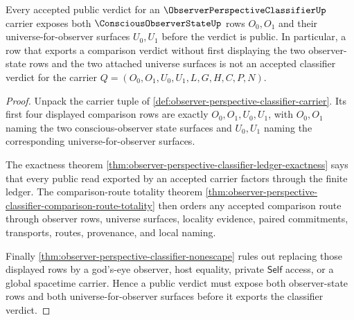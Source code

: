 \begin{theorem}
\label{thm:observer-perspective-classifier-state-totality}
Every accepted public verdict for an $\ObserverPerspectiveClassifierUp$ carrier exposes both $\ConsciousObserverStateUp$ rows $O_0,O_1$ and their universe-for-observer surfaces $U_0,U_1$ before the verdict is public. In particular, a row that exports a comparison verdict without first displaying the two observer-state rows and the two attached universe surfaces is not an accepted classifier verdict for the carrier $Q=(O_0,O_1,U_0,U_1,L,G,H,C,P,N)$.
\end{theorem}
\begin{proof}
Unpack the carrier tuple of \autoref{def:observer-perspective-classifier-carrier}. Its first four displayed comparison rows are exactly $O_0,O_1,U_0,U_1$, with $O_0,O_1$ naming the two conscious-observer state surfaces and $U_0,U_1$ naming the corresponding universe-for-observer surfaces.

The exactness theorem \autoref{thm:observer-perspective-classifier-ledger-exactness} says that every public read exported by an accepted carrier factors through the finite ledger. The comparison-route totality theorem \autoref{thm:observer-perspective-classifier-comparison-route-totality} then orders any accepted comparison route through observer rows, universe surfaces, locality evidence, paired commitments, transports, routes, provenance, and local naming.

Finally \autoref{thm:observer-perspective-classifier-nonescape} rules out replacing those displayed rows by a god's-eye observer, host equality, private $\mathsf{Self}$ access, or a global spacetime carrier. Hence a public verdict must expose both observer-state rows and both universe-for-observer surfaces before it exports the classifier verdict.
\end{proof}

